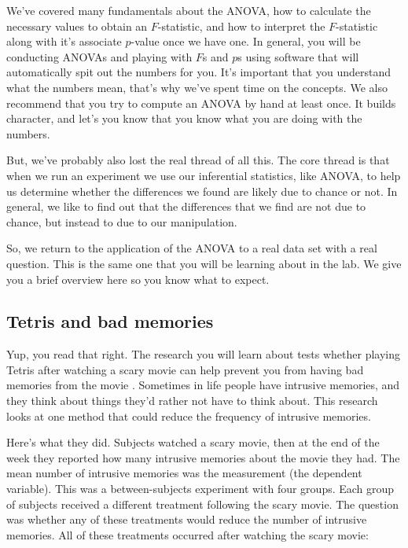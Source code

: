 \documentclass[
]{book}
\begin{document}
We've covered many fundamentals about the ANOVA, how to calculate the necessary values to obtain an \(F\)-statistic, and how to interpret the \(F\)-statistic along with it's associate \(p\)-value once we have one. In general, you will be conducting ANOVAs and playing with \(F\)s and \(p\)s using software that will automatically spit out the numbers for you. It's important that you understand what the numbers mean, that's why we've spent time on the concepts. We also recommend that you try to compute an ANOVA by hand at least once. It builds character, and let's you know that you know what you are doing with the numbers.

But, we've probably also lost the real thread of all this. The core thread is that when we run an experiment we use our inferential statistics, like ANOVA, to help us determine whether the differences we found are likely due to chance or not. In general, we like to find out that the differences that we find are not due to chance, but instead to due to our manipulation.

So, we return to the application of the ANOVA to a real data set with a real question. This is the same one that you will be learning about in the lab. We give you a brief overview here so you know what to expect.

\hypertarget{tetris-and-bad-memories}{%
\subsection{Tetris and bad memories}\label{tetris-and-bad-memories}}

Yup, you read that right. The research you will learn about tests whether playing Tetris after watching a scary movie can help prevent you from having bad memories from the movie \citep{james2015computer}. Sometimes in life people have intrusive memories, and they think about things they'd rather not have to think about. This research looks at one method that could reduce the frequency of intrusive memories.

Here's what they did. Subjects watched a scary movie, then at the end of the week they reported how many intrusive memories about the movie they had. The mean number of intrusive memories was the measurement (the dependent variable). This was a between-subjects experiment with four groups. Each group of subjects received a different treatment following the scary movie. The question was whether any of these treatments would reduce the number of intrusive memories. All of these treatments occurred after watching the scary movie:
\end{document}
